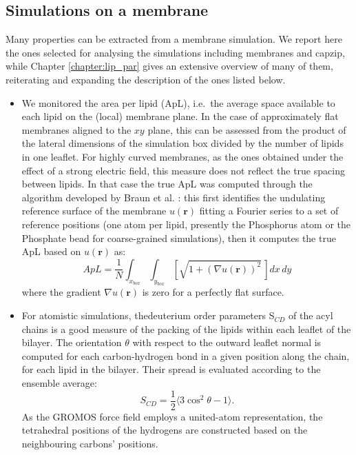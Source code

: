 \subsection{Simulations on a membrane}

Many properties can be extracted from a membrane simulation. We report here the ones selected for analysing the simulations including membranes and capzip, while Chapter \ref{chapter:lip_par} gives an extensive overview of many of them, reiterating and expanding the description of the ones listed below.

\begin{itemize}
\item We monitored the area per lipid (ApL), i.e.\ the average space available to each lipid on the (local) membrane plane. In the case of approximately flat membranes aligned to the $xy$ plane, this can be assessed from the product of the lateral dimensions of the simulation box divided by the number of lipids in one leaflet.
%
For highly curved membranes, as the ones obtained under the effect of a strong electric field, this measure does not reflect the true spacing between lipids. In that case the true ApL was computed through the algorithm developed by Braun et al. \citep{Braun2011}: this first identifies the undulating reference surface of the membrane $u(\textbf{r})$ fitting a Fourier series to a set of reference positions (one atom per lipid, presently the Phosphorus atom or the Phosphate bead for coarse-grained simulations), then it computes the true ApL based on $u(\textbf{r})$ as:
\begin{equation}
ApL = \frac{1}{N} \int_{x_{box}} \int_{y_{box}} \left[ \sqrt{1 + \left( \nabla u(\textbf{r}) \right)^2} \, \right] dx\,dy
\end{equation}
where the gradient $\nabla u(\textbf{r})$ is zero for a perfectly flat surface.

\item For atomistic simulations, thedeuterium order parameters S$_{CD}$ of the acyl chains is a good measure of the packing of the lipids within each leaflet of the bilayer. The orientation $\theta$ with respect to the outward leaflet normal is computed for each carbon-hydrogen bond in a given position along the chain, for each lipid in the bilayer. Their spread is evaluated according to the ensemble average:
\begin{equation}
S_{CD} = \frac{1}{2} \langle 3\cos^2 \theta - 1 \rangle.
\end{equation}
As the GROMOS force field employs a united-atom representation, the tetrahedral positions of the hydrogens are constructed based on the neighbouring carbons’ positions.


\end{itemize}
